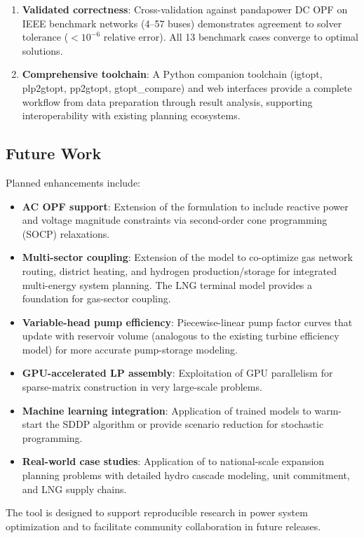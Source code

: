 \begin{enumerate}
  \item \textbf{Validated correctness}: Cross-validation against
    pandapower DC OPF on IEEE benchmark networks (4--57 buses)
    demonstrates agreement to solver tolerance ($<10^{-6}$ relative
    error).  All 13 benchmark cases converge to optimal solutions.

  \item \textbf{Comprehensive toolchain}: A Python companion toolchain
    (igtopt, plp2gtopt, pp2gtopt, gtopt\_compare) and web interfaces
    provide a complete workflow from data preparation through result
    analysis, supporting interoperability with existing planning
    ecosystems.
\end{enumerate}

\subsection{Future Work}

Planned enhancements include:

\begin{itemize}
  \item \textbf{AC OPF support}: Extension of the formulation to include
    reactive power and voltage magnitude constraints via second-order
    cone programming (SOCP) relaxations.
  \item \textbf{Multi-sector coupling}: Extension of the model to
    co-optimize gas network routing, district heating, and hydrogen
    production/storage for integrated multi-energy system planning.
    The LNG terminal model provides a foundation for gas-sector coupling.
  \item \textbf{Variable-head pump efficiency}: Piecewise-linear pump
    factor curves that update with reservoir volume (analogous to the
    existing turbine efficiency model) for more accurate pump-storage
    modeling.
  \item \textbf{GPU-accelerated LP assembly}: Exploitation of GPU
    parallelism for sparse-matrix construction in very large-scale
    problems.
  \item \textbf{Machine learning integration}: Application of trained
    models to warm-start the SDDP algorithm or provide scenario
    reduction for stochastic programming.
  \item \textbf{Real-world case studies}: Application of \gtopt{} to
    national-scale expansion planning problems with detailed hydro
    cascade modeling, unit commitment, and LNG supply chains.
\end{itemize}

The \gtopt{} tool is designed to support reproducible research in power
system optimization and to facilitate community collaboration in future
releases.
